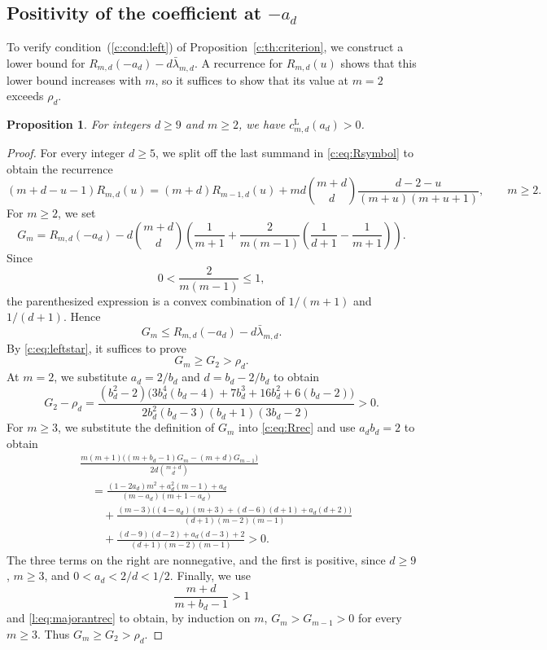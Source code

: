 \documentclass[11pt]{article}
\numberwithin{equation}{section}
\newtheorem{proposition}[theorem]{Proposition}
\theoremstyle{remark}\newtheorem{remark}[theorem]{Remark}
\begin{document}
\subsection{Positivity of the coefficient at \texorpdfstring{$-a_d$}{-a}}\label{sec:leftcoeff}
To verify condition~(\ref{c:cond:left}) of Proposition~\ref{c:th:criterion},
we construct a lower bound for
$R_{m,d}(-a_d)-d\bar\lambda_{m,d}$.
A recurrence for $R_{m,d}(u)$ shows that this lower bound increases with $m$,
so it suffices to show that its value at $m=2$ exceeds $\rho_d$.
\begin{proposition}\label{l:prop:smallpole}
For integers $d\ge9$ and $m\ge2$, we have
$c_{m,d}^{\mathrm L}(a_d)>0$.
\end{proposition}
\begin{proof}
For every integer $d\ge5$, we split off the last summand in
\eqref{c:eq:Rsymbol} to obtain the recurrence
\begin{equation}\label{c:eq:Rrec}
 (m+d-u-1)R_{m,d}(u)=(m+d)R_{m-1,d}(u)
 +md\binom{m+d}{d}\frac{d-2-u}{(m+u)(m+u+1)},\qquad m\ge2.
\end{equation}
For $m\ge2$, we set
\[
 G_m=R_{m,d}(-a_d)-d\binom{m+d}{d}
 \left(\frac1{m+1}+\frac2{m(m-1)}
 \left(\frac1{d+1}-\frac1{m+1}\right)\right).
\]
Since
\[
 0<\frac{2}{m(m-1)}\le1,
\]
the parenthesized expression is a convex
combination of $1/(m+1)$ and $1/(d+1)$. Hence
\[
 G_m\le R_{m,d}(-a_d)-d\bar\lambda_{m,d}.
\]
By \eqref{c:eq:leftstar}, it suffices to prove
\[
 G_m\ge G_2>\rho_d.
\]
At $m=2$, we substitute $a_d=2/b_d$ and $d=b_d-2/b_d$ to obtain
\[
 G_2-\rho_d=
 \frac{(b_d^2-2)\bigl(3b_d^4(b_d-4)+7b_d^3+16b_d^2+6(b_d-2)\bigr)}
 {2b_d^2(b_d-3)(b_d+1)(3b_d-2)}>0.
\]
For $m\ge3$, we substitute the definition of $G_m$ into
\eqref{c:eq:Rrec} and use $a_db_d=2$ to obtain
\begin{equation}\label{l:eq:majorantrec}
\begin{split}
 &\frac{m(m+1)\bigl((m+b_d-1)G_m-(m+d)G_{m-1}\bigr)}
 {2d\binom{m+d}{d}}\\
 &\quad=
 \frac{(1-2a_d)m^2+a_d^2(m-1)+a_d}{(m-a_d)(m+1-a_d)}
 \\
 &\qquad+\frac{(m-3)\bigl((4-a_d)(m+3)+(d-6)(d+1)+a_d(d+2)\bigr)}
 {(d+1)(m-2)(m-1)}\\
 &\qquad+\frac{(d-9)(d-2)+a_d(d-3)+2}{(d+1)(m-2)(m-1)}>0.
\end{split}
\end{equation}
The three terms on the right are nonnegative, and the first is positive,
since $d\ge9$, $m\ge3$, and $0<a_d<2/d<1/2$.
Finally, we use
\[
 \frac{m+d}{m+b_d-1}>1
\]
and \eqref{l:eq:majorantrec} to obtain, by induction on $m$,
$G_m>G_{m-1}>0$ for every $m\ge3$. Thus $G_m\ge G_2>\rho_d$.
\end{proof}
\end{document}
